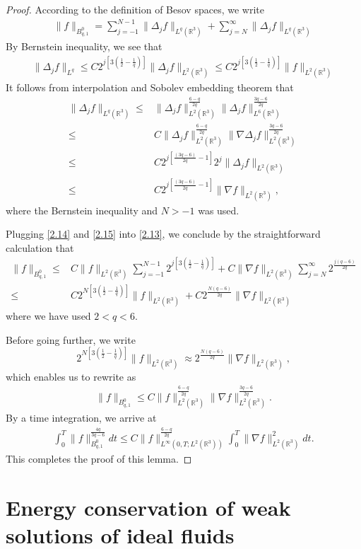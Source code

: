 \documentclass[11pt]{article}
\theoremstyle{plain}\newtheorem{definition}{Definition}[section]
\theoremstyle{definition}\newtheorem{theorem}{Theorem}[section]
\theoremstyle{plain}\newtheorem{lemma}[theorem]{Lemma}
\theoremstyle{plain}\newtheorem{coro}[theorem]{Corollary}
\theoremstyle{plain}\newtheorem{prop}[theorem]{Proposition}
\theoremstyle{remark}\newtheorem{remark}{Remark}[section]
\newcommand{\be}{\begin{equation}}
\newcommand{\ee}{\end{equation}}
\newcommand{\ba}{\begin{aligned}}
\newcommand{\ea}{\end{aligned}}
\newcommand{\f}{\frac}
\numberwithin{equation}{section}
\begin{document}
\begin{proof}
According to the definition of Besov spaces, we write
\be\ba\label{2.13}
\|f\|_{B^{0}_{q,1}}=\sum^{N-1}_{j=-1} \|\Delta_{j}f\|_{L^{q}(\mathbb{R}^{3})}
+\sum^{\infty}_{j=N} \|\Delta_{j}f\|_{L^{q}(\mathbb{R}^{3})}
\ea\ee
By Bernstein inequality, we see that
 \be\ba\label{2.14}
\|\Delta_{j}f\|_{L^{q}}\leq C 2^{j[3(\f12-\f1q)]}\|\Delta_{j}f\|_{L^{2}(\mathbb{R}^{3})}\leq C 2^{j[3(\f12-\f1q)]}\| f\|_{L^{2}(\mathbb{R}^{3})}
\ea\ee
It follows from interpolation and Sobolev embedding theorem that
 \be\ba\label{2.15}
\|\Delta_{j}f\|_{L^{q}(\mathbb{R}^{3})}\leq & \|\Delta_{j}f\|_{L^{2}(\mathbb{R}^{3})}^{\f{6-q}{2q}}\|\Delta_{j}f\|^{\f{3q-6}{2q}}_{L^{6}(\mathbb{R}^{3})}\\
\leq & C \|\Delta_{j}f\|_{L^{2}(\mathbb{R}^{3})}^{\f{6-q}{2q}}\|\nabla\Delta_{j}f\|^{\f{3q-6}{2q}}_{L^{2}(\mathbb{R}^{3})}\\
\leq &C 2^{ j[\f{(3q-6)}{2q}-1]}2^{j}\|\Delta_{j}f\|_{L^{2}(\mathbb{R}^{3})}\\
\leq &C 2^{ j[\f{(3q-6)}{2q}-1]} \|\nabla f\|_{L^{2}(\mathbb{R}^{3})},
\ea\ee
where the Bernstein inequality and $N>-1$ was used.

Plugging \eqref{2.14} and \eqref{2.15} into \eqref{2.13}, we conclude by
the  straightforward  calculation that
\be\ba\label{2.16new}
\|f\|_{B^{0}_{q,1}}\leq& C\| f\|_{L^{2}(\mathbb{R}^{3})}\sum^{N-1}_{j=-1}  2^{j[3(\f12-\f1q)]}
+C \|\nabla f\|_{L^{2}(\mathbb{R}^{3})}\sum^{\infty}_{j=N}2^{\f{j(q-6)}{2q}}
\\
\leq &C   2^{N[3(\f12-\f1q)]}\| f\|_{L^{2}(\mathbb{R}^{3})}
+C  2^{\f{N(q-6)}{2q}}\|\nabla f\|_{L^{2}(\mathbb{R}^{3})}
\ea\ee
where we have used $2<q<6$.

Before going further, we write
$$
2^{N[3(\f12-\f1q)]}\| f\|_{L^{2}(\mathbb{R}^{3})}
\approx  2^{\f{N(q-6)}{2q}}\|\nabla f\|_{L^{2}(\mathbb{R}^{3})},$$
which enables us to rewrite \label{2.16} as
\be\ba
\|f\|_{B^{0}_{q,1}}\leq C\| f\|_{L^{2}(\mathbb{R}^{3})}^{\f{6-q}{2q}}\|\nabla f\|^{\f{3q-6}{2q}}_{L^{2}(\mathbb{R}^{3})}.
\ea\ee
By a time integration, we arrive at
\be\ba
\int_{0}^{T}\|f\|^{ \f{4q}{3q-6 }}_{B^{0}_{q,1}}dt\leq C\| f\|_{L^{\infty}(0,T; L^{2}(\mathbb{R}^{3}))}^{\f{6-q}{2q}}\int_{0}^{T}\|\nabla f\|^{2}_{L^{2}(\mathbb{R}^{3})}
dt.\ea\ee
This completes the proof of this lemma.
\end{proof}


 \section{Energy conservation   of weak solutions of ideal fluids}
\end{document}

